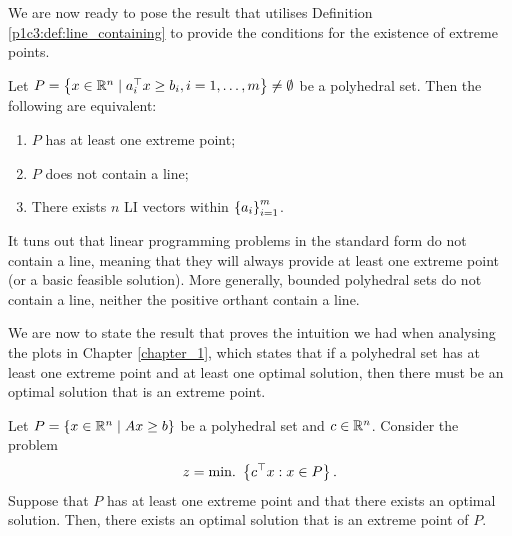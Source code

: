 We are now ready to pose the result that utilises Definition \ref{p1c3:def:line_containing} to provide the conditions for the existence of extreme points.

\begin{theorem}\label{p1c3:thm:exist_extreme_point}
	Let $P = \left\{ x \in \mathbb{R}^n \mid a_i^\top x \geq b_i, i = 1, \dots, m \right \} \neq \emptyset$ be a polyhedral set. Then the following are equivalent:
	\begin{enumerate}
		\item $P$ has at least one extreme point;
		\item $P$ does not contain a line;
		\item There exists $n$ LI vectors within $\left\{ a_i \right \}_{i=1}^m$.	
	\end{enumerate}	
\end{theorem}	 


It tuns out that linear programming problems in the standard form do not contain a line, meaning that they will always provide at least one extreme point (or a basic feasible solution). More generally, bounded polyhedral sets do not contain a line, neither the positive orthant contain a line.

We are now to state the result that proves the intuition we had when analysing the plots in Chapter \ref{chapter_1}, which states that if a polyhedral set has at least one extreme point and at least one optimal solution, then there must be an optimal solution that is an extreme point.

\begin{theorem}\label{p1c3:thm:opt_extreme}
		Let $P = \left\{ x \in \mathbb{R}^n \mid Ax \geq b \right \}$ be a polyhedral set and $c \in \mathbb{R}^n$. Consider the problem 
			\begin{equation*}
		    		z = \mathop{\text{min.~}}\left\{ c^\top x : x \in P \right \}.					
			\end{equation*}
		Suppose that $P$ has at least one extreme point and that there exists an optimal solution. Then, there exists an optimal solution that is an extreme point of $P$.
\end{theorem}


